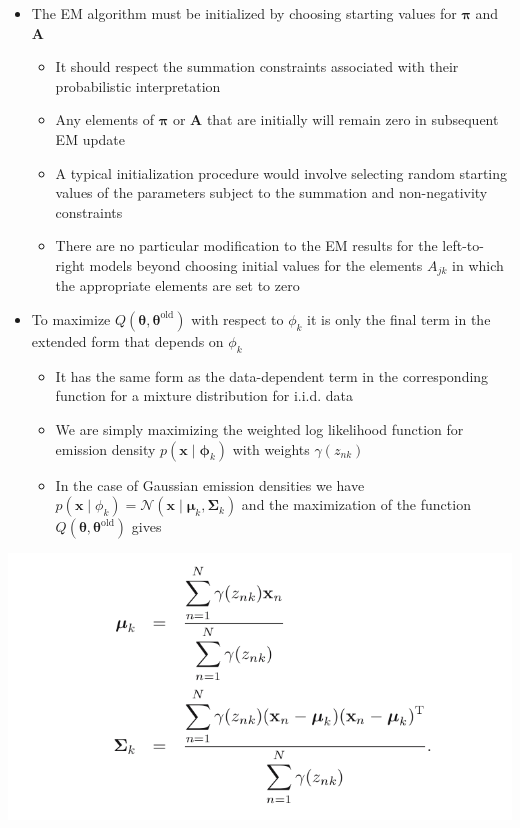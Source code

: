 \documentclass[11pt]{article}
\begin{document}
\begin{itemize}
\item The EM algorithm must be initialized by choosing starting values for \(\pmb \pi\) and \(\pmb A\)
\begin{itemize}
\item It should respect the summation constraints associated with their probabilistic interpretation
\item Any elements of \(\pmb \pi\) or \(\pmb A\) that are initially will remain zero in subsequent EM update
\item A typical initialization procedure would involve selecting random starting values of the parameters subject to the summation and non-negativity constraints
\item There are no particular modification to the EM results for the left-to-right models beyond choosing initial values for the elements \(A_{jk}\) in which the appropriate elements are set to zero
\end{itemize}

\item To maximize \(Q(\pmb \theta, \pmb \theta^\text{old})\) with respect to \(\phi_k\) it is only the final term in the extended form that depends on \(\phi_k\)
\begin{itemize}
\item It has the same form as the data-dependent term in the corresponding function for a mixture distribution for i.i.d. data
\item We are simply maximizing the weighted log likelihood function for emission density \(p(\pmb x \mid \pmb \phi_k)\) with weights \(\gamma(z_{nk})\)
\item In the case of Gaussian emission densities we have \(p(\pmb x \mid \phi_k) = \mathcal N (\pmb x \mid \pmb \mu_k, \pmb \Sigma_k)\) and the maximization of the function \(Q(\pmb \theta, \pmb \theta^\text{old})\) gives
\end{itemize}
\end{itemize}
\begin{center}
\includegraphics[width=.9\linewidth]{Sequential Data/screenshot_2018-11-04_09-58-10.png}
\end{center}
\end{document}
